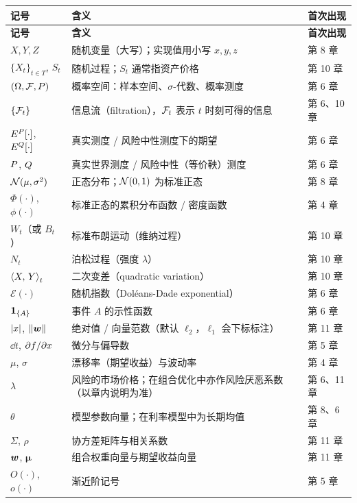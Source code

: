 {\tablefont
\begin{longtable}{@{}L{2.9cm}L{8.6cm}L{3.2cm}@{}}
\toprule
\textbf{记号} & \textbf{含义} & \textbf{首次出现} \\
\midrule
\endfirsthead
\toprule
\textbf{记号} & \textbf{含义} & \textbf{首次出现} \\
\midrule
\endhead
\bottomrule
\endlastfoot
$X, Y, Z$ & 随机变量（大写）；实现值用小写 $x,y,z$ & 第 8 章 \\
$\{X_t\}_{t\in T}$, $S_t$ & 随机过程；$S_t$ 通常指资产价格 & 第 10 章 \\
$(\Omega,\mathcal{F},P)$ & 概率空间：样本空间、$\sigma$-代数、概率测度 & 第 6 章 \\
$\{\mathcal{F}_t\}$ & 信息流（filtration），$\mathcal{F}_t$ 表示 $t$ 时刻可得的信息 & 第 6、10 章 \\
$E^{P}[\cdot]$, $E^{Q}[\cdot]$ & 真实测度 / 风险中性测度下的期望 & 第 6 章 \\
$P$, $Q$ & 真实世界测度 / 风险中性（等价鞅）测度 & 第 6 章 \\
$\mathcal{N}(\mu,\sigma^2)$ & 正态分布；$\mathcal{N}(0,1)$ 为标准正态 & 第 8 章 \\
$\Phi(\cdot)$, $\phi(\cdot)$ & 标准正态的累积分布函数 / 密度函数 & 第 4 章 \\
$W_t$（或 $B_t$） & 标准布朗运动（维纳过程） & 第 10 章 \\
$N_t$ & 泊松过程（强度 $\lambda$） & 第 10 章 \\
$\left\langle X,\, Y \right\rangle_t$ & 二次变差（quadratic variation） & 第 10 章 \\
$\mathcal{E}(\cdot)$ & 随机指数（Dol\'eans-Dade exponential） & 第 6 章 \\
$\mathbf{1}_{\{A\}}$ & 事件 $A$ 的示性函数 & 第 6 章 \\
$\left\lvert x \right\rvert$, $\left\lVert \bm{w} \right\rVert$ & 绝对值 / 向量范数（默认 $\ell_2$，$\ell_1$ 会下标标注） & 第 11 章 \\
$\dd t$, $\partial f/\partial x$ & 微分与偏导数 & 第 5 章 \\
$\mu$, $\sigma$ & 漂移率（期望收益）与波动率 & 第 4 章 \\
$\lambda$ & 风险的市场价格；在组合优化中亦作风险厌恶系数（以章内说明为准） & 第 6、11 章 \\
$\theta$ & 模型参数向量；在利率模型中为长期均值 & 第 8、6 章 \\
$\Sigma$, $\rho$ & 协方差矩阵与相关系数 & 第 11 章 \\
$\bm{w}$, $\bm{\mu}$ & 组合权重向量与期望收益向量 & 第 11 章 \\
$O(\cdot)$, $o(\cdot)$ & 渐近阶记号 & 第 5 章 \\
\end{longtable}
}

